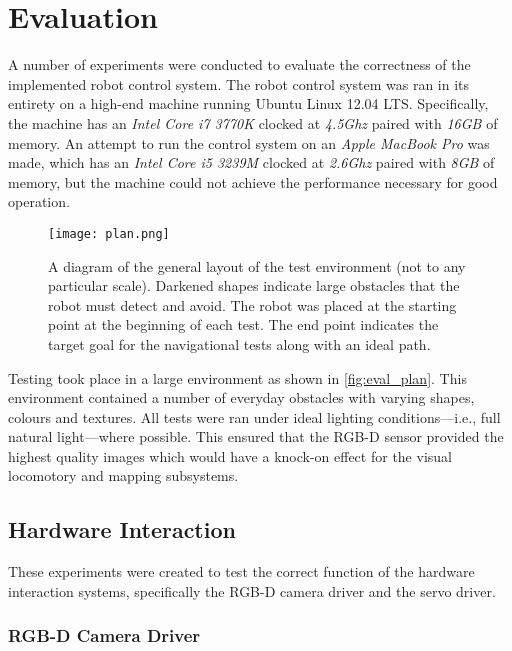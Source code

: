\chapter{Evaluation}
\label{chap:evaluation}


A number of experiments were conducted to evaluate the correctness of the implemented robot control system. The robot control system was ran in its entirety on a high-end machine running Ubuntu Linux 12.04 LTS. Specifically, the machine has an \emph{Intel Core i7 3770K} clocked at \emph{4.5Ghz} paired with \emph{16GB} of memory. An attempt to run the control system on an \emph{Apple MacBook Pro} was made, which has an \emph{Intel Core i5 3239M} clocked at \emph{2.6Ghz} paired with \emph{8GB} of memory, but the machine could not achieve the performance necessary for good operation.

\begin{figure}[!h]
	\centering
	\texttt{[image: plan.png]}
	\caption{A diagram of the general layout of the test environment (not to any particular scale). Darkened shapes indicate large obstacles that the robot must detect and avoid. The robot was placed at the starting point at the beginning of each test. The end point indicates the target goal for the navigational tests along with an ideal path.}
	\label{fig:eval_plan}
\end{figure}

Testing took place in a large environment as shown in \autoref{fig:eval_plan}. This environment contained a number of everyday obstacles with varying shapes, colours and textures. All tests were ran under ideal lighting conditions---i.e., full natural light---where possible. This ensured that the RGB-D sensor provided the highest quality images which would have a knock-on effect for the visual locomotory and mapping subsystems.

\section{Hardware Interaction}

These experiments were created to test the correct function of the hardware interaction systems, specifically the RGB-D camera driver and the servo driver.

\subsection{RGB-D Camera Driver}

